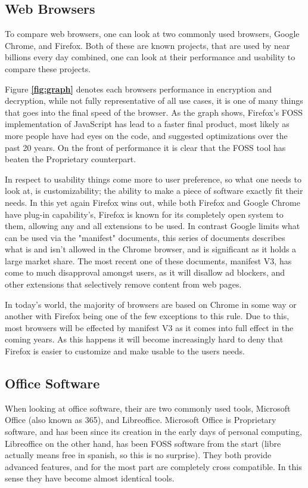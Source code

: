 \documentclass[a4paper,12pt]{article}
\begin{document}
{\subsection{Web Browsers} 
To compare web browsers, one can look at two commonly used browsers, Google Chrome,
and Firefox. Both of these are known projects, that are used by near billions every day combined, one can look at
their performance and usability to compare these projects.

Figure \textbf{\ref{fig:graph}} denotes each browsers performance in encryption and decryption, while not fully
representative of all use cases, it is one of many things that goes into the final speed of the browser. As the
graph shows, Firefox's FOSS implementation of JavaScript has lead to a faster final product, most likely as more
people have had eyes on the code, and suggested optimizations over the past 20 years. On the front of performance
it is clear that the FOSS tool has beaten the Proprietary counterpart.

In respect to usability things come more to user preference, so what one needs to look at, is customizability; the
ability to make a piece of software exactly fit their needs. In this yet again Firefox wins out, while both Firefox
and Google Chrome have plug-in capability's, Firefox is known for its completely open system to them, allowing any
and all extensions to be used. In contrast Google limits what can be used via the "manifest" documents, this series
of documents describes what is and isn't allowed in the Chrome browser, and is significant as it holds a large
market share. The most recent one of these documents, manifest V3\cite{MANIFESTv3}, has come to much disapproval
amongst users, as it will disallow ad blockers, and other extensions that selectively remove content from web pages.

In today's world, the majority of browsers are based on Chrome in some way or another with Firefox being one of
the few exceptions to this rule. Due to this, most browsers will be effected by manifest V3 as it comes into full
effect in the coming years.  As this happens it will become increasingly hard to deny that Firefox is easier to
customize and make usable to the users needs.

\subsection{Office Software} 
When looking at office software, their are two commonly used tools, Microsoft Office
(also known as 365), and Libreoffice.  Microsoft Office is Proprietary software, and has been since its creation
in the early days of personal computing, Libreoffice on the other hand, has been FOSS software from the start
(libre actually means free in spanish, so this is no surprise).  They both provide advanced features, and for the
most part are completely cross compatible. In this sense they have become almost identical tools.

}
\end{document}
